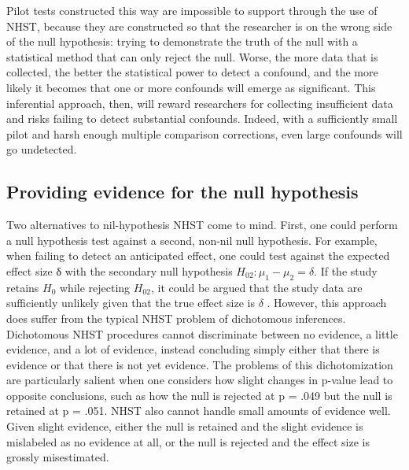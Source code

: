 \documentclass[fignum,nobf,man]{apa}
\begin{document}
Pilot tests constructed this way are impossible to support through the use of NHST, because they are constructed so that the researcher is on the wrong side of the null hypothesis: trying to demonstrate the truth of the null with a statistical method that can only reject the null. Worse, the more data that is collected, the better the statistical power to detect a confound, and the more likely it becomes that one or more confounds will emerge as significant. This inferential approach, then, will reward researchers for collecting insufficient data and risks failing to detect substantial confounds. Indeed, with a sufficiently small pilot and harsh enough multiple comparison corrections, even large confounds will go undetected.

\subsection{Providing evidence for the null hypothesis}
Two alternatives to nil-hypothesis NHST come to mind. First, one could perform a null hypothesis test against a second, non-nil null hypothesis. For example, when failing to detect an anticipated effect, one could test against the expected effect size δ with the secondary null hypothesis $H_{02}: \mu_1 - \mu_2 = \delta$. If the study retains $H_0$ while rejecting $H_{02}$, it could be argued that the study data are sufficiently unlikely given that the true effect size is $\delta$ \citep[e.g.,][]{Simonsohn:etal:2014}. %
However, this approach does suffer from the typical NHST problem of dichotomous inferences. Dichotomous NHST procedures cannot discriminate between no evidence, a little evidence, and a lot of evidence, instead concluding simply either that there is evidence or that there is not yet evidence. The problems of this dichotomization are particularly salient when one considers how slight changes in p-value lead to opposite conclusions, such as how the null is rejected at p = .049 but the null is retained at p = .051. NHST also cannot handle small amounts of evidence well. Given slight evidence, either the null is retained and the slight evidence is mislabeled as no evidence at all, or the null is rejected and the effect size is grossly misestimated. 
\end{document}
